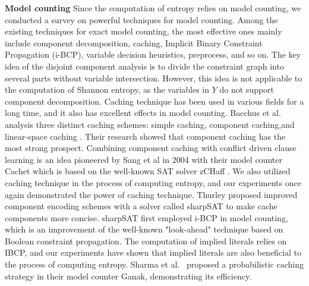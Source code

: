 \textbf{Model counting}
Since the computation of entropy relies on model counting, we conducted a survey on powerful techniques for model counting.
Among the existing techniques for exact model counting, the most effective ones mainly include component decomposition, caching, Implicit Binary Constraint Propagation (i-BCP), variable decision heuristics, preprocess, and so on.
The key idea of the disjoint component analysis is to divide the constraint graph into several parts without variable intersection.
However, this idea is not applicable to the computation of Shannon entropy, as the variables in $Y$ do not support component decomposition.
Caching technique has been used in various fields for a long time, and it also has excellent effects in model counting.
Bacchus et al. analysis three distinct caching schemes: simple caching, component caching,and linear-space caching \cite{bacchus2003dpll}. 
Their research showed that component caching has the most strong prospect. 
Combining component caching with conflict driven clause learning is an idea pioneered by Sang et al \cite{sang2004combining} in 2004 with their model counter Cachet which is based on the well-known SAT solver zCHaff \cite{moskewicz2001chaff}. 
We also utilized caching technique in the process of computing entropy, and our experiments once again demonstrated the power of caching technique.
Thurley \cite{thurley2006sharpsat} proposed improved component encoding schemes with a solver called sharpSAT to make cache components more concise. 
sharpSAT first employed i-BCP in model counting, which is an improvement of the well-known "look-ahead" technique based on Boolean constraint propagation. 
The computation of implied literals relies on IBCP, and our experiments have shown that implied literals are also beneficial to the process of computing entropy.
Sharma et al.~\cite{sharma2019ganak} proposed a probabilistic caching strategy in their model counter Ganak, demonstrating its efficiency.
